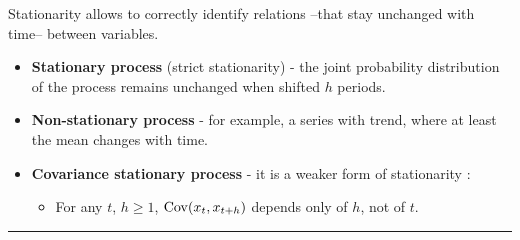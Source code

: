   \begin{f}[Stationarity]

Stationarity allows to correctly identify relations --that stay unchanged with time-- between variables.

\begin{itemize}[leftmargin=*]
	\item \textbf{Stationary process} (strict stationarity) - the joint probability distribution of the process remains unchanged when shifted \(h\) periods.
	\item \textbf{Non-stationary process} - for example, a series with trend, where at least the mean changes with time.
	\item \textbf{Covariance stationary process} - it is a weaker form of stationarity :
	
	\begin{itemize}[leftmargin=*]
		
		\item For any \(t\), \(h \geq 1\), \(\mathrm{Cov}(x_{t}, x_{t + h})\) depends only of \(h\), not of \(t\).
	\end{itemize}
\end{itemize}

\end{f}  \hrule

